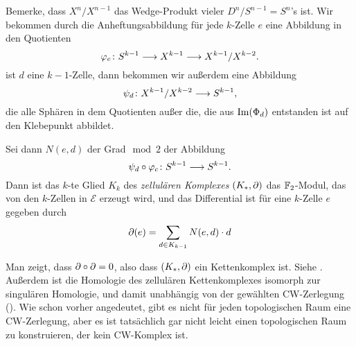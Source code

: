 \begin{definition}
    \label{def: zellulaere homologie}
    Bemerke, dass $X^n / X^{n - 1}$ das Wedge-Produkt vieler $D^n / S^{n-1} = S^n$'s ist. 
    Wir bekommen durch die Anheftungsabbildung für jede $k$-Zelle $e$ eine Abbildung in den 
    Quotienten
    \[ \varphi_e \colon S^{k-1} \longrightarrow X^{k - 1} \longrightarrow X^{k - 1} / X^{k - 2} . \]
    ist $d$ eine $k - 1$-Zelle, dann bekommen wir außerdem eine Abbildung 
    \[ \psi_d \colon X^{k - 1} / X^{k - 2} \longrightarrow S^{k - 1} , \]
    die alle Sphären in dem Quotienten außer die, die aus ${ \operatorname{Im} } (\Phi_d)$ entstanden ist
    auf den Klebepunkt abbildet.

    Sei dann $N(e, d)$ der Grad$\mod 2$ der Abbildung
    \[ \psi_d \circ \varphi_c \colon S^{k - 1} \longrightarrow S^{k - 1} . \]
    Dann ist das $k$-te Glied $K_k$ des \textit{zellulären Komplexes} $(K_{\ast}, { \partial })$ das 
    ${ \mathbb F }_2$-Modul, das von den $k$-Zellen in $\mathcal{E}$ erzeugt wird, und das Differential ist für 
    eine $k$-Zelle $e$ gegeben durch
    \[ { \partial } (e) = \sum_{d \in K_{k  - 1}} N(e, d) \cdot d \] 
\end{definition}

\begin{remark}
    Man zeigt, dass ${ \partial } \circ { \partial } = 0$, also dass $(K_{\ast}, { \partial })$ ein Kettenkomplex ist. 
    Siehe \cite{dold}. Außerdem ist die Homologie des zellulären Kettenkomplexes isomorph zur 
    singulären Homologie, und damit unabhängig von der gewählten CW-Zerlegung (\cite{hatcher}). 
    Wie schon vorher angedeutet, gibt es nicht für jeden topologischen Raum eine CW-Zerlegung,
    aber es ist tatsächlich gar nicht leicht einen topologischen Raum zu konstruieren, der 
    kein CW-Komplex ist.
\end{remark}


